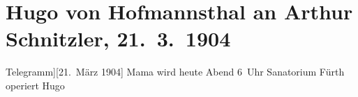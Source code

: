 

         
         \renewcommand{\erwaehntePersonen}{Personen: Hugo von Hofmannsthal, Anna von Hofmannsthal}
         \renewcommand{\erwaehnteOrte}{Orte: Sanatorium Fürth, Wien}
         \renewcommand{\erwaehnteWerke}{}
               \section[Hugo von Hofmannsthal an Arthur Schnitzler, 21. 3. 1904]{ Hugo von Hofmannsthal an Arthur Schnitzler, 21. 3. 1904}\nopagebreak{}\rehead{ }\begin{ledgroupsized}[t]{13cm}\normalsize\beginnumbering \toendnotes[C]{\smallbreak\pagebreak[2]} \toendnotes[C]{\smallbreak}\pstart
           \noindent{}{\pb}{[}Telegramm{]}\hfill {[}21. März 1904{]}\pend
           \pstart
           Mama wird heute Abend
                  6 Uhr{ }Sanatorium Fürth operiert \pend
           \pstart \spacefill\mbox{Hugo}\pend{}
         
         \endnumbering{}\end{ledgroupsized}  \newcommand{\dateiname}{L01387}\newcommand{\titel}{Hugo von Hofmannsthal an Arthur Schnitzler, 21. 3. 1904}\newcommand{\editorInnen}{Martin Anton Müller und Gerd-Hermann Susen}
      